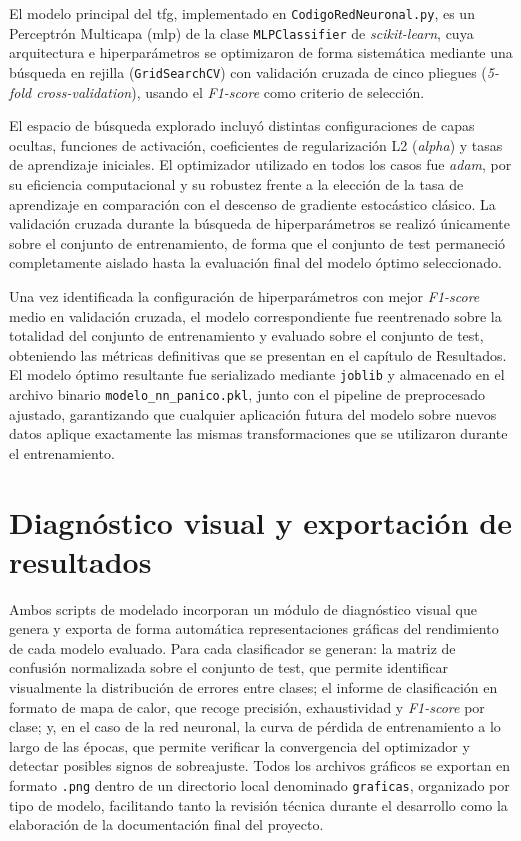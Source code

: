 \documentclass[12pt]{report} %
\begin{document}
El modelo principal del \gls{tfg}, implementado en \texttt{CodigoRedNeuronal.py}, es un Perceptrón Multicapa (\gls{mlp}) de la clase \texttt{MLPClassifier} de \textit{scikit-learn}, cuya arquitectura e hiperparámetros se optimizaron de forma sistemática mediante una búsqueda en rejilla (\texttt{GridSearchCV}) con validación cruzada de cinco pliegues (\textit{5-fold cross-validation}), usando el \textit{F1-score} como criterio de selección.
 
El espacio de búsqueda explorado incluyó distintas configuraciones de capas ocultas, funciones de activación, coeficientes de regularización L2 (\textit{alpha}) y tasas de aprendizaje iniciales. El optimizador utilizado en todos los casos fue \textit{adam}, por su eficiencia computacional y su robustez frente a la elección de la tasa de aprendizaje en comparación con el descenso de gradiente estocástico clásico. La validación cruzada durante la búsqueda de hiperparámetros se realizó únicamente sobre el conjunto de entrenamiento, de forma que el conjunto de test permaneció completamente aislado hasta la evaluación final del modelo óptimo seleccionado.
 
Una vez identificada la configuración de hiperparámetros con mejor \textit{F1-score} medio en validación cruzada, el modelo correspondiente fue reentrenado sobre la totalidad del conjunto de entrenamiento y evaluado sobre el conjunto de test, obteniendo las métricas definitivas que se presentan en el capítulo de Resultados. El modelo óptimo resultante fue serializado mediante \texttt{joblib} y almacenado en el archivo binario \texttt{modelo\_nn\_panico.pkl}, junto con el pipeline de preprocesado ajustado, garantizando que cualquier aplicación futura del modelo sobre nuevos datos aplique exactamente las mismas transformaciones que se utilizaron durante el entrenamiento.
 
\section{Diagnóstico visual y exportación de resultados}
 
Ambos scripts de modelado incorporan un módulo de diagnóstico visual que genera y exporta de forma automática representaciones gráficas del rendimiento de cada modelo evaluado. Para cada clasificador se generan: la matriz de confusión normalizada sobre el conjunto de test, que permite identificar visualmente la distribución de errores entre clases; el informe de clasificación en formato de mapa de calor, que recoge precisión, exhaustividad y \textit{F1-score} por clase; y, en el caso de la red neuronal, la curva de pérdida de entrenamiento a lo largo de las épocas, que permite verificar la convergencia del optimizador y detectar posibles signos de sobreajuste. Todos los archivos gráficos se exportan en formato \texttt{.png} dentro de un directorio local denominado \texttt{graficas}, organizado por tipo de modelo, facilitando tanto la revisión técnica durante el desarrollo como la elaboración de la documentación final del proyecto.
\end{document}
